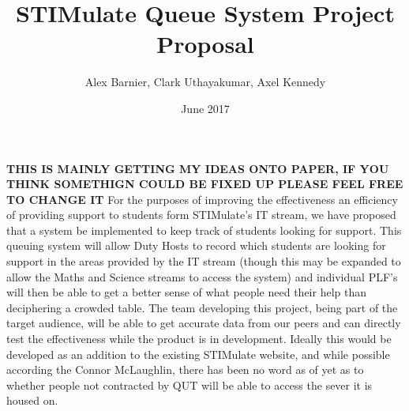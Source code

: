\documentclass{article}
\begin{document}
	\title{STIMulate Queue System Project Proposal}
	\author{Alex Barnier, Clark Uthayakumar, Axel Kennedy}
	\date{June 2017}
	\maketitle
	
	\textbf{THIS IS MAINLY GETTING MY IDEAS ONTO PAPER, IF YOU THINK SOMETHIGN COULD BE FIXED UP PLEASE FEEL FREE TO CHANGE IT}
	\newline
	\newline
	For the purposes of improving the effectiveness an efficiency of providing support to students form STIMulate's IT stream, we have proposed that a system be implemented to keep track of students looking for support. This queuing system will allow Duty Hosts to record which students are looking for support in the areas provided by the IT stream (though this may be expanded to allow the Maths and Science streams to access the system) and individual PLF's will then be able to get a better sense of what people need their help than deciphering a crowded table.
	\newline
	\newline
	The team developing this project, being part of the target audience, will be able to get accurate data from our peers and can directly test the effectiveness while the product is in development.
	\newline
	\newline
	Ideally this would be developed as an addition to the existing STIMulate website, and while possible according the Connor McLaughlin, there has been no word as of yet as to whether people not contracted by QUT will be able to access the sever it is housed on.
\end{document}
